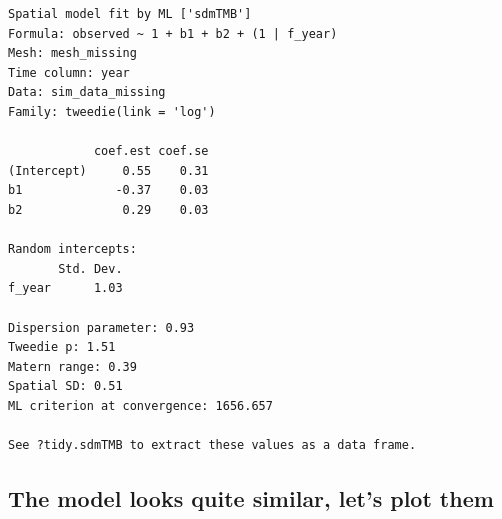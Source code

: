 \documentclass[
  letterpaper,
  DIV=11,
  numbers=noendperiod]{scrartcl}
\begin{document}
\begin{verbatim}
Spatial model fit by ML ['sdmTMB']
Formula: observed ~ 1 + b1 + b2 + (1 | f_year)
Mesh: mesh_missing
Time column: year
Data: sim_data_missing
Family: tweedie(link = 'log')
 
            coef.est coef.se
(Intercept)     0.55    0.31
b1             -0.37    0.03
b2              0.29    0.03

Random intercepts:
       Std. Dev.
f_year      1.03

Dispersion parameter: 0.93
Tweedie p: 1.51
Matern range: 0.39
Spatial SD: 0.51
ML criterion at convergence: 1656.657

See ?tidy.sdmTMB to extract these values as a data frame.
\end{verbatim}

\hypertarget{the-model-looks-quite-similar-lets-plot-them}{%
\subsection{The model looks quite similar, let's plot
them}\label{the-model-looks-quite-similar-lets-plot-them}}
\end{document}
